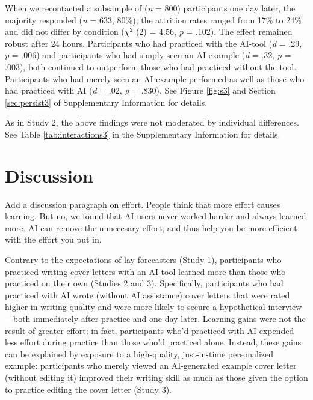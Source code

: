 \documentclass[11pt]{report}
\begin{document}
\begin{mainf}
When we recontacted a subsample of (\textit{n} = 800) participants one day later, 
  the majority responded (\textit{n} = 633, 80\%); the attrition rates ranged from 17\% to 24\% and did not differ by condition ($\chi^2$ (2) = 4.56, \textit{p} = .102).
  The effect remained robust after 24 hours. Participants who had practiced with the AI-tool (\emph{d} = .29, \emph{p} = .006) and participants who had simply seen an AI example (\emph{d} = .32, \emph{p} = .003), both continued to outperform those who had practiced without the tool. Participants who had merely seen an AI example performed as well as those who had practiced with AI (\emph{d} = .02, \emph{p} = .830). See Figure \ref{fig:s3} and Section \ref{sec:persist3} of Supplementary Information for details.

As in Study 2, the above findings were not moderated by individual differences. See Table \ref{tab:interactions3} in the
Supplementary Information for details.




\section{Discussion} 

Add a discussion paragraph on effort. People think that more effort causes learning. But no, we found that AI users never worked harder and always learned more. AI can remove the unnecesary effort, and thus help you be more efficient with the effort you put in. 

Contrary to the expectations of lay forecasters (Study 1), participants who practiced writing cover letters with an AI tool learned more than those who practiced on their own (Studies 2 and 3). Specifically, participants who had practiced with AI wrote (without AI assistance) cover letters that were rated higher in writing quality and were more likely to secure a hypothetical interview---both immediately after practice and one day later.
Learning gains were not the result of greater effort; in fact, participants who'd practiced with AI expended less effort during practice than those who'd practiced alone. Instead, these gains can be explained by exposure to a high-quality, just-in-time personalized example: participants who merely viewed an AI-generated example cover letter (without editing it) improved their writing skill as much as those given the option to practice editing the cover letter (Study 3).


\end{mainf}
\end{document}
